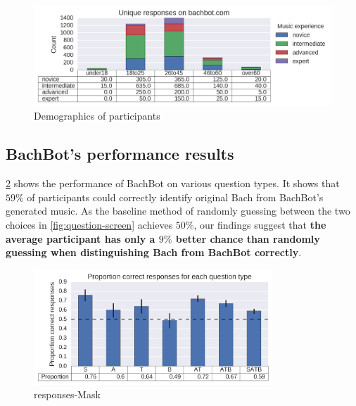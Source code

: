 \begin{figure}[htpb]
  \centering
  \includegraphics[width=\textwidth]{responses-ageGroup-musicExperience.png}
  \caption{Demographics of participants}
  \label{fig:user-demographics}
\end{figure}

\subsection{BachBot's performance results}


\cref{fig:responses-mask} shows the performance of BachBot on various question
types. It shows that $59\%$ of participants could correctly
identify original Bach from BachBot's generated music. As the baseline method
of randomly guessing between the two choices in \cref{fig:question-screen}
achieves $50\%$, our findings suggest that {\bf the average participant has only a
$9\%$ better chance than randomly guessing when
distinguishing Bach from BachBot correctly}.

\begin{figure}[htpb]
  \centering
  \includegraphics[width=0.8\textwidth]{responses-mask.png}
  \caption{responses-Mask}
  \label{fig:responses-mask}
\end{figure}

